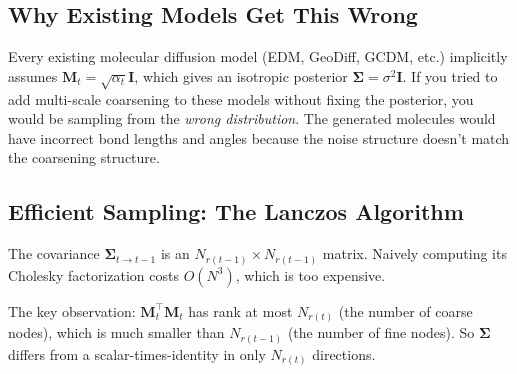 \documentclass[12pt,a4paper]{article}
\begin{document}
\begin{center}
\end{center}

\subsection{Why Existing Models Get This Wrong}

Every existing molecular diffusion model (EDM, GeoDiff, GCDM, etc.) implicitly assumes $\bm{M}_t = \sqrt{\alpha_t} \bm{I}$, which gives an isotropic posterior $\bm{\Sigma} = \sigma^2 \bm{I}$. If you tried to add multi-scale coarsening to these models without fixing the posterior, you would be sampling from the \emph{wrong distribution}. The generated molecules would have incorrect bond lengths and angles because the noise structure doesn't match the coarsening structure.

\subsection{Efficient Sampling: The Lanczos Algorithm}

The covariance $\bm{\Sigma}_{t \to t-1}$ is an $N_{r(t-1)} \times N_{r(t-1)}$ matrix. Naively computing its Cholesky factorization costs $O(N^3)$, which is too expensive.

The key observation: $\bm{M}_t^\top \bm{M}_t$ has rank at most $N_{r(t)}$ (the number of coarse nodes), which is much smaller than $N_{r(t-1)}$ (the number of fine nodes). So $\bm{\Sigma}$ differs from a scalar-times-identity in only $N_{r(t)}$ directions.
\end{document}
